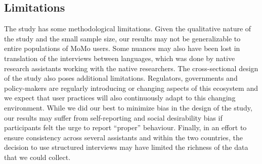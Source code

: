 \subsection{Limitations}
The study has some methodological limitations. Given the qualitative nature of the study and the small sample size, our results may not be generalizable to entire populations of MoMo users. Some nuances may also have been lost in translation of the interviews between  languages, which was done by native research assistants working with the native researchers.
The cross-sectional design of the study also poses additional limitations. Regulators, governments and policy-makers are regularly introducing or changing aspects of this ecosystem and we expect that user  practices will also continuously adapt to this changing environment. 
While we did our best to minimize bias in the design of the study, our results may suffer from self-reporting and social desirability bias if participants felt the urge to report ``proper'' behaviour. 
Finally, in an effort to ensure consistency across several assistants and within the two countries, the decision to use structured interviews may have limited the richness of the data that we could collect.   